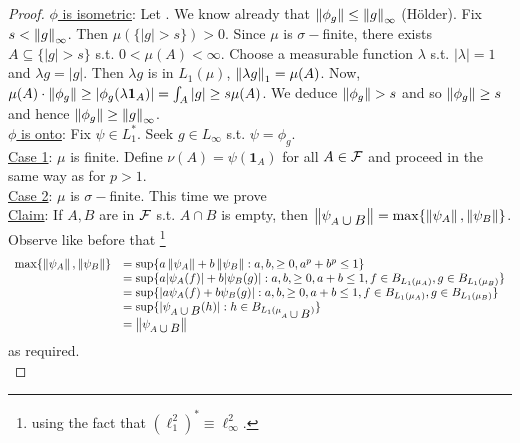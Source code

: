 \documentclass{article}
\begin{document}
\begin{proof}
\noindent\underline{$\phi$ is isometric}: Let . We know already that $\left\lVert\phi_g\right\rVert\leq \left\lVert g\right\rVert_\infty$ (H\"{o}lder). Fix $s<\left\lVert g\right\rVert_\infty$. Then $\mu(\{|g|>s\})>0$. Since $\mu$ is $\sigma-$finite, there exists $A\subseteq\{|g|>s\}$ s.t. $0<\mu(A)<\infty$. Choose a measurable function $\lambda$ s.t. $|\lambda|=1$ and $\lambda g = |g|$. Then $\lambda g$ is in $L_1(\mu)$,  $\left\lVert\lambda g\right\rVert_1=\mu(A)$. Now, $\mu(A)\cdot \left\lVert\phi_g\right\rVert\geq |\phi_g(\lambda \mathbf{1}_A)|=\int_A|g|\geq s\mu(A)$.  We deduce $\left\lVert\phi_g\right\rVert>s$ and so $\left\lVert\phi_g\right\rVert\geq s$ and hence $\left\lVert\phi_g\right\rVert\geq \left\lVert g\right\rVert_\infty$.  \\

\noindent\underline{$\phi$ is onto}: Fix $\psi\in L_1^*$. Seek $g\in L_\infty$
s.t. $\psi = \phi_g$.\\

\noindent\underline{Case 1}: $\mu$ is finite. Define $\nu(A)=\psi(\mathbf{1}_A)$ for all $A\in\mathcal{F}$ and proceed in the same way as for $p>1$. \\

\noindent\underline{Case 2}: $\mu$ is $\sigma-$finite. This time we prove\\

\noindent\underline{Claim}: If $A,B$ are in $\mathcal{F}$ s.t. $A\cap B$ is empty, then $\left\lVert\psi_{A\displaystyle\cup B}\right\rVert=\max\{\left\lVert\psi_A\right\rVert, \left\lVert\psi_B\right\rVert\}$.\\
    Observe like before that \footnote{using the fact that $(\ell^2_1)^*\equiv \ell^2_\infty$.}
    $$
    \begin{array}{ll}
    \max\{\left\lVert\psi_A\right\rVert, \left\lVert\psi_B\right\rVert\}
    &=\sup\{a\left\lVert\psi_A\right\rVert+b\left\lVert\psi_B\right\rVert: a,b,\geq 0, a^p+b^p\leq 1\}\\
    &= \sup\{a|\psi_A(f)|+b|\psi_B(g)|: a,b,\geq 0, a+b\leq 1, f\in B_{L_1(\mu_A)}, g\in B_{L_1(\mu_B)}\}\\
    &= \sup\{|a\psi_A(f)+b\psi_B(g)|: a,b,\geq 0, a+b\leq 1, f\in B_{L_1(\mu_A)}, g\in B_{L_1(\mu_B)}\}\\
    &= \sup\{|\psi_{A\displaystyle\cup B}(h)|: h\in B_{L_1(\mu_{A\displaystyle\cup B})}\}\\
    &=\left\lVert\psi_{A\displaystyle\cup B}\right\rVert
    \end{array}
    $$
    as required.\\
    

\end{proof}
\end{document}
